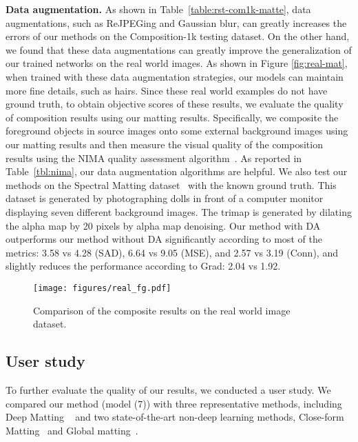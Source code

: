 \documentclass[10pt,twocolumn,letterpaper]{article}
\begin{document}
\noindent\textbf{Data augmentation.} As shown in Table~\ref{table:rst-com1k-matte}, data augmentations, such as ReJPEGing and Gaussian blur, can greatly increases the errors of our methods on the Composition-1k testing dataset. On the other hand, we found that these data augmentations can greatly improve the generalization of our trained networks on the real world images. As shown in Figure \ref{fig:real-mat}, when trained with these data augmentation strategies, our models can maintain more fine details, such as hairs. Since these real world examples do not have ground truth, to obtain objective scores of these results, we evaluate the quality of composition results using our matting results. Specifically, we composite the foreground objects in source images onto some external background images using our matting results and then measure the visual quality of the composition results using the NIMA quality assessment algorithm~\cite{talebi2018nima}. As reported in Table~\ref{tbl:nima}, our data augmentation algorithms are helpful.  We also test our methods on the Spectral Matting dataset~\cite{levin2008spectral} with the known ground truth. This dataset is generated by photographing dolls in front of a computer monitor displaying seven different background images. The trimap is generated by dilating the alpha map by 20 pixels by alpha map denoising. Our method with DA outperforms our method without DA significantly according to most of the metrics: 3.58 vs 4.28 (SAD), 6.64 vs 9.05 (MSE), and 2.57 vs 3.19 (Conn), and slightly reduces the performance according to Grad: 2.04 vs 1.92.






\begin{figure*}[t]
	\centering
	\texttt{[image: figures/real\_fg.pdf]}\vspace{-0.06in}
	\caption{Comparison of the composite results on the real world image dataset\cite{xu2017deep}.}\vspace{-0.2in}
	\label{fig:real-fg}
\end{figure*}

\subsection{User study}
\label{sec:study}

To further evaluate the quality of our results, we conducted a user study. We compared our method (model (7)) with three representative methods, including Deep Matting ~\cite{xu2017deep} and two state-of-the-art non-deep learning methods, Close-form Matting~\cite{levin2008closed} and  Global matting~\cite{he2011global}. 
\end{document}
